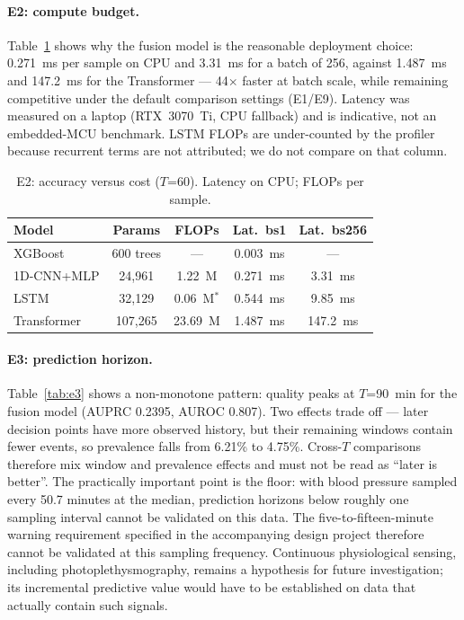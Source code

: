 \documentclass{article}
\begin{document}
\paragraph{E2: compute budget.} Table~\ref{tab:e2} shows why the fusion model is the reasonable deployment choice: 0.271~ms per sample on CPU and 3.31~ms for a batch of 256, against 1.487~ms and 147.2~ms for the Transformer --- 44$\times$ faster at batch scale, while remaining competitive under the default comparison settings (E1/E9). Latency was measured on a laptop (RTX~3070~Ti, CPU fallback) and is indicative, not an embedded-MCU benchmark. LSTM FLOPs are under-counted by the profiler because recurrent terms are not attributed; we do not compare on that column.

\begin{table}[t]
\caption{E2: accuracy versus cost ($T$=60). Latency on CPU; FLOPs per sample.}
\label{tab:e2}
\centering
\begin{tabular}{lcccc}
\toprule
Model & Params & FLOPs & Lat.\ bs1 & Lat.\ bs256 \\
\midrule
XGBoost & 600 trees & --- & 0.003~ms & --- \\
1D-CNN+MLP & 24{,}961 & 1.22~M & 0.271~ms & 3.31~ms \\
LSTM & 32{,}129 & 0.06~M$^*$ & 0.544~ms & 9.85~ms \\
Transformer & 107{,}265 & 23.69~M & 1.487~ms & 147.2~ms \\
\bottomrule
\end{tabular}
\end{table}

\paragraph{E3: prediction horizon.} Table~\ref{tab:e3} shows a non-monotone pattern: quality peaks at $T$=90~min for the fusion model (AUPRC 0.2395, AUROC 0.807). Two effects trade off --- later decision points have more observed history, but their remaining windows contain fewer events, so prevalence falls from 6.21\% to 4.75\%. Cross-$T$ comparisons therefore mix window and prevalence effects and must not be read as ``later is better''. The practically important point is the floor: with blood pressure sampled every 50.7 minutes at the median, prediction horizons below roughly one sampling interval cannot be validated on this data. The five-to-fifteen-minute warning requirement specified in the accompanying design project therefore cannot be validated
at this sampling frequency. Continuous physiological sensing, including photoplethysmography, remains a hypothesis for future
investigation; its incremental predictive value would have to be established on data that actually contain such signals.
\end{document}
